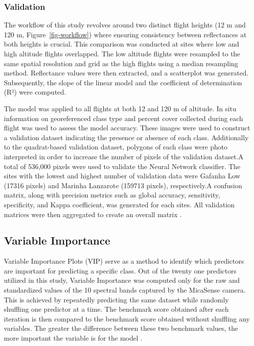 \documentclass[
  number]{elsarticle}
\begin{document}
\subsubsection{Validation}\label{validation}

The workflow of this study revolves around two distinct flight heights
(12 m and 120 m, Figure~\ref{fig-workflow}) where ensuring consistency
between reflectances at both heights is crucial. This comparison was
conducted at sites where low and high altitude flights overlapped. The
low altitude flights were resampled to the same spatial resolution and
grid as the high flights using a median resampling method. Reflectance
values were then extracted, and a scatterplot was generated.
Subsequently, the slope of the linear model and the coefficient of
determination (R²) were computed.

The model was applied to all flights at both 12 and 120 m of altitude.
In situ information on georeferenced class type and percent cover
collected during each flight was used to assess the model accuracy.
These images were used to construct a validation dataset indicating the
presence or absence of each class. Additionally to the quadrat-based
validation dataset, polygons of each class were photo interpreted in
order to increase the number of pixels of the validation dataset.A total
of 536,000 pixels were used to validate the Neural Network classifier.
The sites with the lowest and highest number of validation data were
Gafanha Low (17316 pixels) and Marinha Lanzarote (159713 pixels),
respectively.A confusion matrix, along with precision metrics such as
global accuracy, sensitivity, specificity, and Kappa coefficient, was
generated for each sites. All validation matrices were then aggregated
to create an overall matrix .

\subsection{Variable Importance}\label{variable-importance}

Variable Importance Plots (VIP) serve as a method to identify which
predictors are important for predicting a specific class. Out of the
twenty one predictors utilized in this study, Variable Importance was
computed only for the raw and standardized values of the 10 spectral
bands captured by the MicaSense camera. This is achieved by repeatedly
predicting the same dataset while randomly shuffling one predictor at a
time. The benchmark score obtained after each iteration is then compared
to the benchmark score obtained without shuffling any variables. The
greater the difference between these two benchmark values, the more
important the variable is for the model \citep{WEI2015399}.
\end{document}
